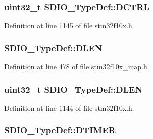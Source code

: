 \subsubsection[{\texorpdfstring{D\+C\+T\+RL}{DCTRL}}]{ {\bf uint32\+\_\+t} S\+D\+I\+O\+\_\+\+Type\+Def\+::\+D\+C\+T\+RL}\hypertarget{struct_s_d_i_o___type_def_a801519a7af801ad43b88007bf4e2e906}{}\label{struct_s_d_i_o___type_def_a801519a7af801ad43b88007bf4e2e906}


Definition at line 1145 of file stm32f10x.\+h.

\subsubsection[{\texorpdfstring{D\+L\+EN}{DLEN}}]{ S\+D\+I\+O\+\_\+\+Type\+Def\+::\+D\+L\+EN}\hypertarget{struct_s_d_i_o___type_def_ac4632b59442c28f1ed4fda64947c828b}{}\label{struct_s_d_i_o___type_def_ac4632b59442c28f1ed4fda64947c828b}


Definition at line 478 of file stm32f10x\+\_\+map.\+h.

\subsubsection[{\texorpdfstring{D\+L\+EN}{DLEN}}]{ {\bf uint32\+\_\+t} S\+D\+I\+O\+\_\+\+Type\+Def\+::\+D\+L\+EN}\hypertarget{struct_s_d_i_o___type_def_aa98ab507ed05468ca4baccd1731231cd}{}\label{struct_s_d_i_o___type_def_aa98ab507ed05468ca4baccd1731231cd}


Definition at line 1144 of file stm32f10x.\+h.

\subsubsection[{\texorpdfstring{D\+T\+I\+M\+ER}{DTIMER}}]{ S\+D\+I\+O\+\_\+\+Type\+Def\+::\+D\+T\+I\+M\+ER}\hypertarget{struct_s_d_i_o___type_def_a40cb7120e8a1ea1b529d2c2e5f279793}{}\label{struct_s_d_i_o___type_def_a40cb7120e8a1ea1b529d2c2e5f279793}


